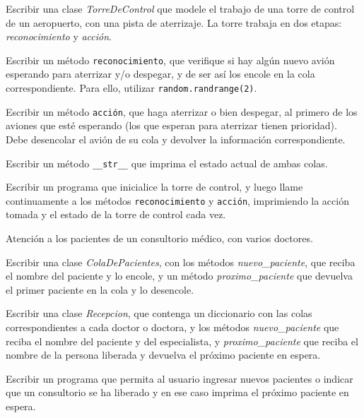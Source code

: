 \begin{ejercicio}
Escribir una clase {\it TorreDeControl} que modele el trabajo de una torre
de control de un aeropuerto, con una pista de aterrizaje.  La torre trabaja
en dos etapas: {\it reconocimiento} y {\it acción}.
\begin{partes}
    \item Escribir un método \verb!reconocimiento!, que verifique si hay algún
nuevo avión esperando para aterrizar y/o despegar, y de ser así los encole
en la cola correspondiente. Para ello, utilizar \verb!random.randrange(2)!.
    \item Escribir un método \verb!acción!, que haga aterrizar o
bien despegar, al primero de los aviones que esté esperando (los que
esperan para aterrizar tienen prioridad). Debe desencolar el avión de su
cola y devolver la información correspondiente.
    \item Escribir un método \verb!__str__! que imprima el estado actual de
ambas colas.
    \item Escribir un programa que inicialice la torre de control, y luego llame
continuamente a los métodos \verb!reconocimiento! y \verb!acción!,
imprimiendo la acción tomada y el estado de la torre de control cada vez.
\end{partes}
\end{ejercicio}


\begin{ejercicio}
Atención a los pacientes de un consultorio médico, con varios doctores.
\begin{partes}
    \item Escribir una clase {\it ColaDePacientes}, con los métodos {\it
nuevo\_paciente}, que reciba el nombre del paciente y lo encole, y un
método {\it proximo\_paciente} que devuelva el primer paciente en la cola y
lo desencole.
    \item Escribir una clase {\it Recepcion}, que contenga un diccionario con
las colas correspondientes a cada doctor o doctora, y los métodos {\it
nuevo\_paciente} que reciba el nombre del paciente y del especialista, y
{\it proximo\_paciente} que reciba el nombre de la persona liberada y
devuelva el próximo paciente en espera.
    \item Escribir un programa que permita al usuario ingresar nuevos pacientes
o indicar que un consultorio se ha liberado y en ese caso imprima el
próximo paciente en espera.
\end{partes}
\end{ejercicio}


